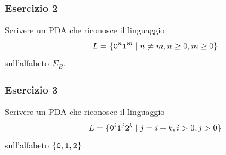 \begin{frame}
        \frametitle{Esercizio 2}
        Scrivere un PDA che riconosce il linguaggio
        \[
                L = \{ \mathtt{0}^{n} \mathtt{1}^{m} \; \vert \; n \neq m, n\ge 0, m\ge 0 \}
        \]
        sull'alfabeto $\Sigma_{B}$.
\end{frame}


\begin{frame}
        \frametitle{Esercizio 3}
        Scrivere un PDA che riconosce il linguaggio
        \[
                L = \{ \mathtt{0}^{i} \mathtt{1}^{j} \mathtt{2}^{k} \; \vert \; j = i + k, i>0, j>0 \}
        \]
        sull'alfabeto $\{\mathtt{0}, \mathtt{1}, \mathtt{2}\}$.
\end{frame}


